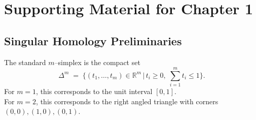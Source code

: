 \chapter{Supporting Material for Chapter 1}

\section{Singular Homology Preliminaries}\label{MorseTheoryAppendix}
\begin{definition} \label{def:std-simplex}
The standard $m$--simplex is the compact set
$$ \Delta^{m}\;=\;\bigl\{(t_1,\dots,t_m)\in\mathbb R^{m}\,\big|\,t_i\ge 0,\;\sum_{i=1}^{m} t_i \le 1\bigr\}.$$ 
For $m=1$, this corresponds to the unit interval $[0,1]$.\\
For $m=2$, this corresponds to the right angled triangle with corners $(0,0), (1,0), (0,1)$.
\end{definition}

